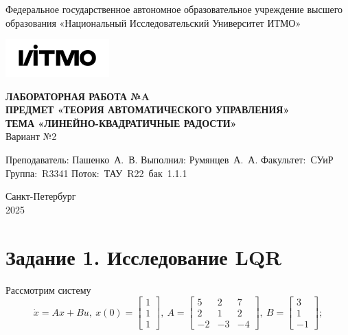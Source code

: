 \documentclass[a4paper, 12pt]{article}
\begin{document}
    \begin{titlepage}

        \begin{center}
        Федеральное государственное автономное образовательное учреждение высшего образования
        «Национальный Исследовательский Университет ИТМО»
        \vfill
        
        \includegraphics[width=0.3\textwidth]{itmo.png} %

        {\large\bf ЛАБОРАТОРНАЯ РАБОТА №A}\\
        {\large\bf ПРЕДМЕТ «ТЕОРИЯ АВТОМАТИЧЕСКОГО УПРАВЛЕНИЯ»}\\
        {\large\bf ТЕМА «ЛИНЕЙНО-КВАДРАТИЧНЫЕ РАДОСТИ»}\\
        Вариант №2
        \vfill

        \begin{flushright}
            \begin{minipage}{.45\textwidth}
            {
                \hbox{Преподаватель:}
                \hbox{Пашенко А. В.}
                \hbox{}
                \hbox{Выполнил:}
                \hbox{Румянцев А. А.}
                \hbox{}
                \hbox{Факультет: СУиР}
                \hbox{Группа: R3341}
                \hbox{Поток: ТАУ R22 бак 1.1.1}
            }
            \end{minipage}
        \end{flushright}
        \vfill
  
        Санкт-Петербург\\
        2025
        \end{center}
    \end{titlepage}
    
    \tableofcontents

    \newpage
    \section{Задание 1. Исследование LQR}
    Рассмотрим систему
    $$
    \dot{x}=Ax+Bu,\ x(0)=\begin{bmatrix}
        1\\1\\1
    \end{bmatrix},\ A=\begin{bmatrix}
        5 &2 &7\\
        2 &1 &2\\
        -2 &-3 &-4
    \end{bmatrix},\ B=\begin{bmatrix}
        3\\1\\-1
    \end{bmatrix};
    $$
\end{document}

